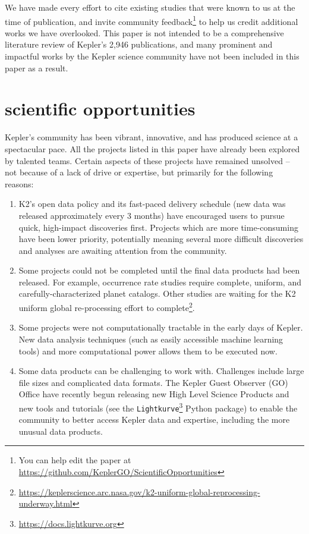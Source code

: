 \documentclass[modern]{aastex62}
\begin{document}
We have made every effort to cite existing studies that were known to us at the time of publication, and invite community feedback\footnote{You can help edit the paper at \url{https://github.com/KeplerGO/ScientificOpportunities}} to help us credit additional works we have overlooked. This paper is not intended to be a comprehensive literature review of Kepler's 2,946 publications, and many prominent and impactful works by the Kepler science community have not been included in this paper as a result.\\


\section{scientific opportunities}

Kepler's community has been vibrant, innovative, and has produced science at a spectacular pace. 
All the projects listed in this paper have already been explored by talented teams. Certain aspects of these projects have remained unsolved -- not because of a lack of drive or expertise, but primarily for the following reasons:

\begin{enumerate}
\item K2's open data policy and its fast-paced delivery schedule (new data was released approximately every 3 months) have encouraged users to pursue quick, high-impact discoveries first. Projects which are more time-consuming have been lower priority, potentially meaning several more difficult discoveries and analyses are awaiting attention from the community.
\item Some projects could not be completed until the final data products had been released. For example, occurrence rate studies require complete, uniform, and carefully-characterized planet catalogs. Other studies are waiting for the K2 uniform global re-processing effort to complete\footnote{\url{https://keplerscience.arc.nasa.gov/k2-uniform-global-reprocessing-underway.html}}.
\item Some projects were not computationally tractable in the early days of Kepler. New data analysis techniques (such as easily accessible machine learning tools) and more computational power allows them to be executed now.
\item Some data products can be challenging to work with. Challenges include large file sizes and complicated data formats. The Kepler Guest Observer (GO) Office have recently begun releasing new High Level Science Products \citep[e.g. mosaics of star clusters,][]{cody2018} and new tools and tutorials (see the \texttt{Lightkurve}\footnote{\url{https://docs.lightkurve.org}} Python package) to enable the community to better access Kepler data and expertise, including the more unusual data products. 
\end{enumerate}
\end{document}
